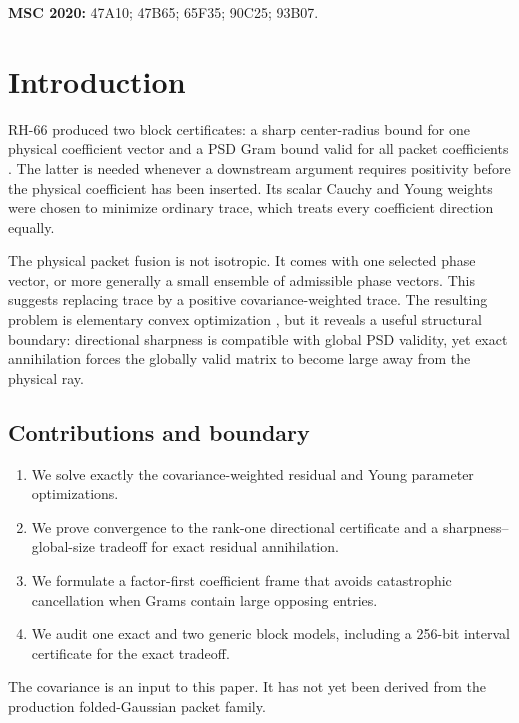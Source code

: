 \documentclass[11pt]{article}
\begin{document}
\medskip
\noindent\textbf{MSC 2020:} 47A10; 47B65; 65F35; 90C25; 93B07.

\section{Introduction}

RH-66 produced two block certificates: a sharp center-radius bound for one
physical coefficient vector and a PSD Gram bound valid for all packet
coefficients \citep{WangBlockGram2026}.  The latter is needed whenever a
downstream argument requires positivity before the physical coefficient has
been inserted.  Its scalar Cauchy and Young weights were chosen to minimize
ordinary trace, which treats every coefficient direction equally.

The physical packet fusion is not isotropic.  It comes with one selected
phase vector, or more generally a small ensemble of admissible phase vectors.
This suggests replacing trace by a positive covariance-weighted trace.  The
resulting problem is elementary convex optimization
\citep{BoydVandenberghe2004}, but it reveals a useful structural boundary:
directional sharpness is compatible with global PSD validity, yet exact
annihilation forces the globally valid matrix to become large away from the
physical ray.

\subsection*{Contributions and boundary}

\begin{enumerate}[leftmargin=2.2em]
 \item We solve exactly the covariance-weighted residual and Young parameter
       optimizations.
 \item We prove convergence to the rank-one directional certificate and a
       sharpness--global-size tradeoff for exact residual annihilation.
 \item We formulate a factor-first coefficient frame that avoids catastrophic
       cancellation when Grams contain large opposing entries.
 \item We audit one exact and two generic block models, including a 256-bit
       interval certificate for the exact tradeoff.
\end{enumerate}

The covariance is an input to this paper.  It has not yet been derived from
the production folded-Gaussian packet family.
\end{document}
